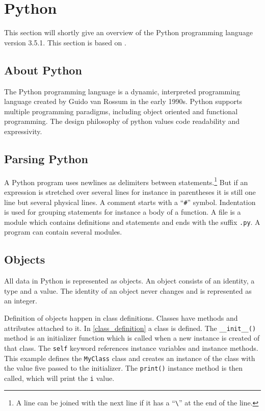 \section{Python}\label{python}
This section will shortly give an overview of the Python programming language version 3.5.1.
This section is based on \citet{python_docs}.

\subsection{About Python}
The Python programming language is a dynamic, interpreted programming language created by Guido van Rossum in the early 1990s.
Python supports multiple programming paradigms, including object oriented and functional programming.
The design philosophy of python values code readability and expressivity.

\subsection{Parsing Python}
A Python program uses newlines as delimiters between statements.\footnote{A line can be joined with the next line if it has a ``\texttt{\textbackslash}'' at the end of the line.}
But if an expression is stretched over several lines for instance in parentheses it is still one line but several physical lines.
A comment starts with a ``\texttt{\#}'' symbol.
Indentation is used for grouping statements for instance a body of a function.
A file is a module which contains definitions and statements and ends with the suffix \texttt{.py}.
A program can contain several modules.

\subsection{Objects}
All data in Python is represented as objects.
An object consists of an identity, a type and a value.
The identity of an object never changes and is represented as an integer.

Definition of objects happen in class definitions.
Classes have methods and attributes attached to it.
In \cref{class_definition} a class is defined.
The \texttt{\_\_init\_\_()} method is an initializer function which is called when a new instance is created of that class.
The \texttt{self} keyword references instance variables and instance methods.
This example defines the \texttt{MyClass} class and creates an instance of the class with the value five passed to the initializer.
The \texttt{print()} instance method is then called, which will print the \texttt{i} value.

